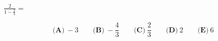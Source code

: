 

$ \frac{2}{1-\frac{2}{3}}=$


\[ \textbf{(A)}\ -3 \qquad
\textbf{(B)}\ -\frac{4}{3} \qquad
\textbf{(C)}\ \frac{2}{3} \qquad
\textbf{(D)}\ 2 \qquad
\textbf{(E)}\ 6
\]